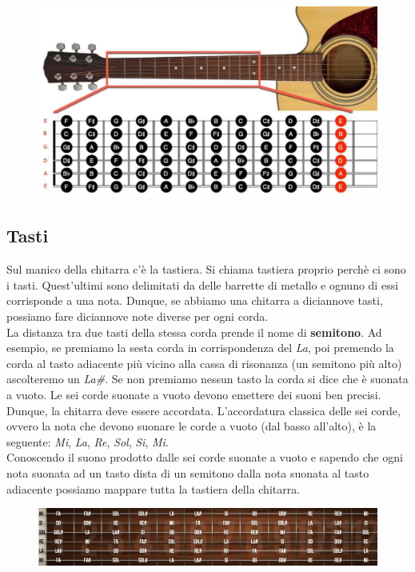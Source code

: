 \begin{figure}[H]
	\centering
	\includegraphics[scale=0.35]{./images/img12.jpg}
\end{figure}

\subsection{Tasti}
Sul manico della chitarra c’è la tastiera. Si chiama tastiera proprio perchè ci sono i tasti. Quest'ultimi sono delimitati da delle barrette di metallo e ognuno di essi corrisponde a una nota. Dunque, se abbiamo una chitarra a diciannove tasti, possiamo fare diciannove note diverse per ogni corda.\\
La distanza tra due tasti della stessa corda prende il nome di \textbf{semitono}. Ad esempio, se premiamo la sesta corda in corrispondenza del \textit{La}, poi premendo la corda al tasto adiacente più vicino alla cassa di risonanza (un semitono più alto) ascolteremo un \textit{La\#}. Se non premiamo nessun tasto la corda si dice che è suonata a vuoto. Le sei corde suonate a vuoto devono emettere dei suoni ben precisi. Dunque, la chitarra deve essere accordata. L'accordatura classica delle sei corde, ovvero la nota che devono suonare le corde a vuoto (dal basso all'alto), è la seguente: \textit{Mi}, \textit{La}, \textit{Re}, \textit{Sol}, \textit{Si}, \textit{Mi}. \\ Conoscendo il suono prodotto dalle sei corde suonate a vuoto e sapendo che ogni nota suonata ad un tasto dista di un semitono dalla nota suonata al tasto adiacente possiamo mappare tutta la tastiera della chitarra.
\begin{figure}[H]
	\centering
	\includegraphics[scale=0.60]{./images/img13.jpg}
\end{figure}

